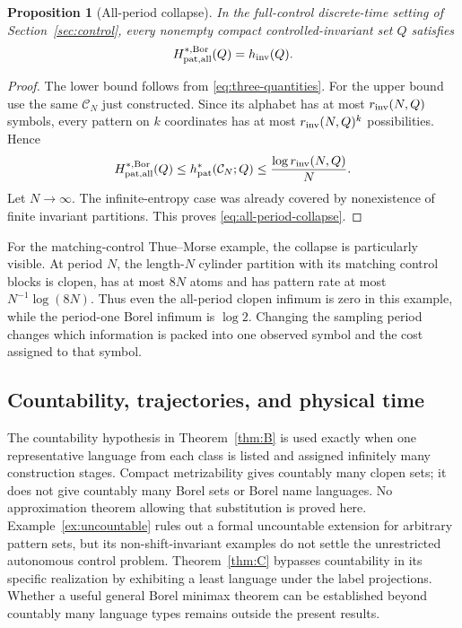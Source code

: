 \documentclass[11pt,reqno]{amsart}
\numberwithin{equation}{section}
\newtheorem{proposition}[theorem]{Proposition}
\theoremstyle{definition}
\newcommand{\C}{\mathcal C}
\newcommand{\hpat}{h_{\mathrm{pat}}^{*}}
\newcommand{\hinv}{h_{\mathrm{inv}}}
\newcommand{\Bor}{\mathrm{Bor}}
\begin{document}
\begin{proposition}[All-period collapse]\label{prop:all-period-collapse}
In the full-control discrete-time setting of Section~\ref{sec:control}, every
nonempty compact controlled-invariant set $Q$ satisfies
\begin{equation}\label{eq:all-period-collapse}
 H_{\rm pat,all}^{*,\Bor}(Q)=\hinv(Q).
\end{equation}
\end{proposition}

\begin{proof}
The lower bound follows from
\eqref{eq:three-quantities}. For the upper bound use the same
$\C_N$ just constructed. Since its alphabet has at most
$r_{\rm inv}(N,Q)$ symbols, every pattern on $k$ coordinates has at most
$r_{\rm inv}(N,Q)^k$ possibilities. Hence
\begin{align*}
 H_{\rm pat,all}^{*,\Bor}(Q)
 \le\hpat(\C_N;Q)
 \le\frac{\log r_{\rm inv}(N,Q)}{N}.
\end{align*}
Let $N\to\infty$. The infinite-entropy case was already covered by
nonexistence of finite invariant partitions. This proves
\eqref{eq:all-period-collapse}.
\end{proof}

For the matching-control Thue--Morse example, the collapse is particularly
visible. At period $N$, the length-$N$ cylinder partition with its matching
control blocks is clopen, has at most $8N$ atoms and has pattern rate at
most $N^{-1}\log(8N)$. Thus even the all-period clopen infimum is zero
in this example, while the period-one Borel infimum is $\log2$.
Changing the sampling period changes which information is packed into
one observed symbol and the cost assigned to that symbol.

\subsection{Countability, trajectories, and physical time}
The countability hypothesis in Theorem~\ref{thm:B} is used exactly when
one representative language from each class is listed and assigned
infinitely many construction stages. Compact metrizability gives
countably many clopen sets; it does not give countably many Borel sets
or Borel name languages. No approximation theorem allowing that
substitution is proved here. Example~\ref{ex:uncountable} rules out a
formal uncountable extension for arbitrary pattern sets, but its
non-shift-invariant examples do not settle the unrestricted autonomous
control problem. Theorem~\ref{thm:C} bypasses countability in its specific
realization by exhibiting a least language under the label projections.
Whether a useful general Borel minimax theorem can be established beyond
countably many language types remains outside the present results.
\end{document}
